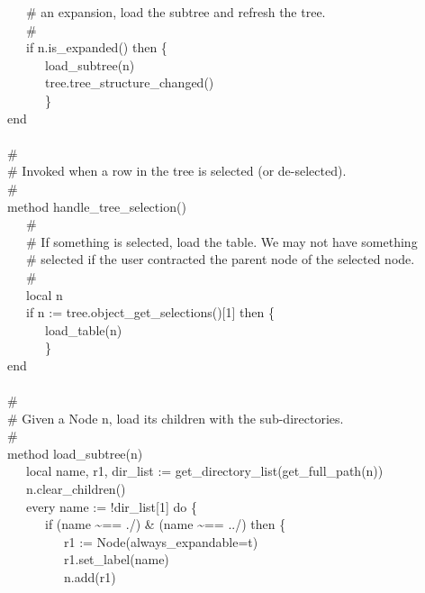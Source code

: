 {\>   \ \ \ \# an expansion, load the subtree and refresh the tree. \\
\>   \ \ \ \# \\
\>   \ \ \ if n.is\_expanded() then \{ \\
\>   \ \ \ \ \ \ load\_subtree(n) \\
\>   \ \ \ \ \ \ tree.tree\_structure\_changed() \\
\>   \ \ \ \ \ \ \} \\
\>   end \\
\ \\
\>   \# \\
\>   \# Invoked when a row in the tree is selected (or de-selected). \\
\>   \# \\
\>   method handle\_tree\_selection() \\
\>   \ \ \ \# \\
\>   \ \ \ \# If something is selected, load the table. We may not have something\\
\>   \ \ \ \# selected if the user contracted the parent node of the selected node. \\
\>   \ \ \ \# \\
\>   \ \ \ local n \\
\>   \ \ \ if n := tree.object\_get\_selections()[1] then \{ \\
\>   \ \ \ \ \ \ load\_table(n) \\
\>   \ \ \ \ \ \ \} \\
\>   end \\
\ \\
\>   \# \\
\>   \# Given a Node n, load its children with the sub-directories. \\
\>   \# \\
\>   method load\_subtree(n) \\
\>   \ \ \ local name, r1, dir\_list := get\_directory\_list(get\_full\_path(n)) \\
\>   \ \ \ n.clear\_children() \\
\>   \ \ \ every name := !dir\_list[1] do \{ \\
\>   \ \ \ \ \ \ if (name \~{}== {\textquotedbl}./{\textquotedbl}) \&
(name \~{}== {\textquotedbl}../{\textquotedbl}) then \{ \\
\>   \ \ \ \ \ \ \ \ \ r1 :=
Node({\textquotedbl}always\_expandable=t{\textquotedbl}) \\
\>   \ \ \ \ \ \ \ \ \ r1.set\_label(name) \\
\>   \ \ \ \ \ \ \ \ \ n.add(r1) \\
}
